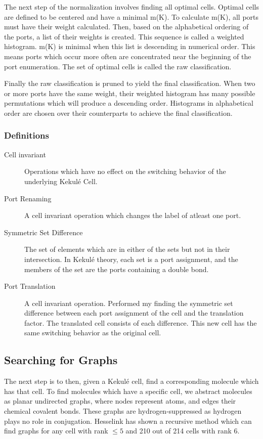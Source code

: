 \documentclass[12pt]{article}
\begin{document}
The next step of the normalization involves finding all optimal cells. Optimal cells are defined to be centered and have a minimal m(K). To calculate m(K), all ports must have their weight calculated. Then, based on the alphabetical ordering of the ports, a list of their weights is created. This sequence is called a weighted histogram. m(K) is minimal when this list is descending in numerical order. %
This means ports which occur more often are concentrated near the beginning of the port enumeration. The set of optimal cells is called the raw classification. 

Finally the raw classification is pruned to yield the final classification. When two or more ports have the same weight, their weighted histogram has many possible permutations which will produce a descending order. Histograms in alphabetical order are chosen over their counterparts to achieve the final classification. 

\subsubsection{Definitions}
\begin{description}
\item[Cell invariant] Operations which have no effect on the switching behavior of the underlying Kekul\'e Cell.
\item[Port Renaming] A cell invariant operation which changes the label of atleast one port. 
\item[Symmetric Set Difference] The set of elements which are in either of the sets but not in their intersection. In Kekul\'e theory, each set is a port assignment, and the members of the set are the ports containing a double bond.
\item[Port Translation] A cell invariant operation. Performed my finding the symmetric set difference between each port assignment of the cell and the translation factor. The translated cell consists of each difference. This new cell has the same switching behavior as the original cell.
\end{description}

\subsection{Searching for Graphs}

The next step is to then, given a Kekul\'e cell, find a corresponding molecule which has that cell. To find molecules which have a specific cell, we abstract molecules as planar undirected graphs, where nodes represent atoms, and edges their chemical covalent bonds. These graphs are hydrogen-suppressed as hydrogen plays no role in conjugation. Hesselink \cite{H13} has shown a recursive method which can find graphs for any cell with rank $\le 5$ and 210 out of 214 cells with rank 6. 
\end{document}
